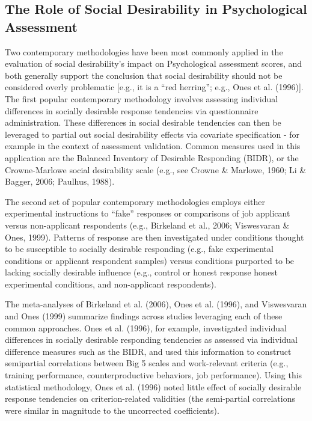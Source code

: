 \documentclass[
  ,man]{apa6}
\begin{document}
\hypertarget{the-role-of-social-desirability-in-psychological-assessment}{%
\subsection{The Role of Social Desirability in Psychological Assessment}\label{the-role-of-social-desirability-in-psychological-assessment}}

Two contemporary methodologies have been most commonly applied in the evaluation of social desirability's impact on Psychological assessment scores, and both generally support the conclusion that social desirability should not be considered overly problematic {[}e.g., it is a ``red herring''; e.g., Ones et al. (1996){]}. The first popular contemporary methodology involves assessing individual differences in socially desirable response tendencies via questionnaire administration. These differences in social desirable tendencies can then be leveraged to partial out social desirability effects via covariate specification - for example in the context of assessment validation. Common measures used in this application are the Balanced Inventory of Desirable Responding (BIDR), or the Crowne-Marlowe social desirability scale (e.g., see Crowne \& Marlowe, 1960; Li \& Bagger, 2006; Paulhus, 1988).

The second set of popular contemporary methodologies employs either experimental instructions to ``fake'' responses or comparisons of job applicant versus non-applicant respondents (e.g., Birkeland et al., 2006; Viswesvaran \& Ones, 1999). Patterns of response are then investigated under conditions thought to be susceptible to socially desirable responding (e.g., fake experimental conditions or applicant respondent samples) versus conditions purported to be lacking socially desirable influence (e.g., control or honest response honest experimental conditions, and non-applicant respondents).

The meta-analyses of Birkeland et al. (2006), Ones et al. (1996), and Viswesvaran and Ones (1999) summarize findings across studies leveraging each of these common approaches. Ones et al. (1996), for example, investigated individual differences in socially desirable responding tendencies as assessed via individual difference measures such as the BIDR, and used this information to construct semipartial correlations between Big 5 scales and work-relevant criteria (e.g., training performance, counterproductive behaviors, job performance). Using this statistical methodology, Ones et al. (1996) noted little effect of socially desirable response tendencies on criterion-related validities (the semi-partial correlations were similar in magnitude to the uncorrected coefficients).
\end{document}
